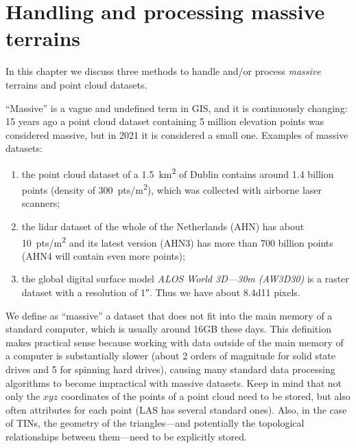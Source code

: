 
\setchapterpreamble[u]{\margintoc}

\chapter{Handling and processing massive terrains}%
\label{chap:massive}


\graphicspath{{massive/}}


In this chapter we discuss three methods to handle and/or process \emph{massive} terrains and point cloud datasets.

%

``Massive'' is a vague and undefined term in GIS, and it is continuously changing: 15 years ago a point cloud dataset containing 5 million elevation points was considered massive, but in 2021 it is considered a small one.%
Examples of massive datasets: 
\begin{enumerate}
  \item the point cloud dataset of a \qty{1.5}{km^2} of Dublin contains around 1.4 billion points (density of \qty{300}{pts/m^2}), which was collected with airborne laser scanners; 
  \item the lidar dataset of the whole of the Netherlands (AHN) has about \qty{10}{pts/m^2} and its latest version (AHN3) has more than 700 billion points (AHN4 will contain even more points);
  \item the global digital surface model \emph{ALOS World 3D---30m (AW3D30)} is a raster dataset with a resolution of \ang{;;1}. Thus we have about \num{8.4d11} pixels.
\end{enumerate}

%

We define as ``massive'' a dataset that does not fit into the main memory of a standard computer, which is usually around 16GB these days.
This definition makes practical sense because working with data outside of the main memory of a computer is substantially slower (about 2 orders of magnitude for solid state drives and 5 for spinning hard drives), causing many standard data processing algorithms to become impractical with massive datasets.
Keep in mind that not only the $xyz$ coordinates of the points of a point cloud need to be stored, but also often attributes for each point (LAS has several standard ones).
Also, in the case of TINs, the geometry of the triangles---and potentially the topological relationships between them---need to be explicitly stored.

